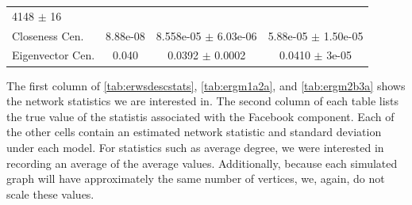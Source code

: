 \documentclass[12pt,twoside]{amherstthesis}
\begin{document}
\begin{longtable}[]{@{}lccc@{}}
\begin{minipage}[t]{0.29\columnwidth}
  4148 \(\pm\) 16\strut
  \end{minipage}\tabularnewline
  \begin{minipage}[t]{0.20\columnwidth}\raggedright\strut
  Closeness Cen.\strut
  \end{minipage} & \begin{minipage}[t]{0.12\columnwidth}\centering\strut
  8.88e-08\strut
  \end{minipage} & \begin{minipage}[t]{0.27\columnwidth}\centering\strut
  8.558e-05 \(\pm\) 6.03e-06\strut
  \end{minipage} & \begin{minipage}[t]{0.29\columnwidth}\centering\strut
  5.88e-05 \(\pm\) 1.50e-05\strut
  \end{minipage}\tabularnewline
  \begin{minipage}[t]{0.20\columnwidth}\raggedright\strut
  Eigenvector Cen.\strut
  \end{minipage} & \begin{minipage}[t]{0.12\columnwidth}\centering\strut
  0.040\strut
  \end{minipage} & \begin{minipage}[t]{0.27\columnwidth}\centering\strut
  0.0392 \(\pm\) 0.0002\strut
  \end{minipage} & \begin{minipage}[t]{0.29\columnwidth}\centering\strut
  0.0410 \(\pm\) 3e-05\strut
  \end{minipage}\tabularnewline
  \bottomrule
  \end{longtable}
  
  The first column of \autoref{tab:erwsdescstats}, \autoref{tab:ergm1a2a},
  and \autoref{tab:ergm2b3a} shows the network statistics we are
  interested in. The second column of each table lists the true value of
  the statistis associated with the Facebook component. Each of the other
  cells contain an estimated network statistic and standard deviation
  under each model. For statistics such as average degree, we were
  interested in recording an average of the average values. Additionally,
  because each simulated graph will have approximately the same number of
  vertices, we, again, do not scale these values.
  
\end{document}
